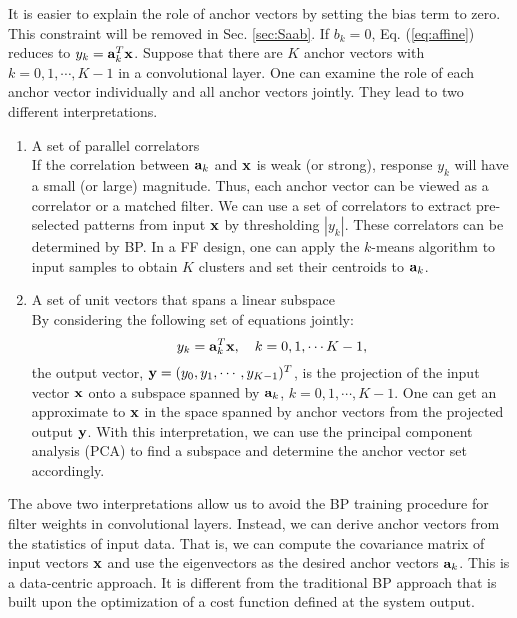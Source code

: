 \documentclass[preprint,12pt]{elsarticle}
\begin{document}
It is easier to explain the role of anchor vectors by setting the bias
term to zero. This constraint will be removed in Sec. \ref{sec:Saab}.
If $b_k=0$, Eq. (\ref{eq:affine}) reduces to $y_k = {\bf a}_k^T {\bf
x}$. Suppose that there are $K$ anchor vectors with $k=0, 1, \cdots,
K-1$ in a convolutional layer. One can examine the role of each anchor
vector individually and all anchor vectors jointly. They lead to two
different interpretations. 
\begin{enumerate}
\item A set of parallel correlators \cite{kuo2016understanding,
kuo2017cnn} \\
If the correlation between ${\bf a}_k$ and ${\bf x}$ is weak (or
strong), response $y_k$ will have a small (or large) magnitude.  Thus,
each anchor vector can be viewed as a correlator or a matched filter.
We can use a set of correlators to extract pre-selected patterns from
input ${\bf x}$ by thresholding $|y_k|$. These correlators can be
determined by BP. In a FF design, one can apply the $k$-means
algorithm to input samples to obtain $K$ clusters and set their
centroids to ${\bf a}_k$. 
\item A set of unit vectors that spans a linear subspace
\cite{kuo2018data} \\
By considering the following set of equations jointly:
\begin{equation}\label{eq:projection}
y_k = {\bf a}_k^T {\bf x}, \quad k=0, 1, \cdots K-1,
\end{equation}
the output vector, ${\bf y}=(y_0, y_1, \cdots , y_{K-1})^T$, is the
projection of the input vector ${\bf x}$ onto a subspace spanned by
${\bf a}_k$, $k=0, 1, \cdots, K-1$.  One can get an approximate to ${\bf
x}$ in the space spanned by anchor vectors from the projected output
${\bf y}$. With this interpretation, we can use the principal component
analysis (PCA) to find a subspace and determine the anchor vector set
accordingly. 
\end{enumerate}

The above two interpretations allow us to avoid the BP training
procedure for filter weights in convolutional layers. Instead, we can
derive anchor vectors from the statistics of input data. That is, we can
compute the covariance matrix of input vectors ${\bf x}$ and use the
eigenvectors as the desired anchor vectors ${\bf a}_k$.  This is a
data-centric approach. It is different from the traditional BP approach
that is built upon the optimization of a cost function defined at the
system output. 
\end{document}
